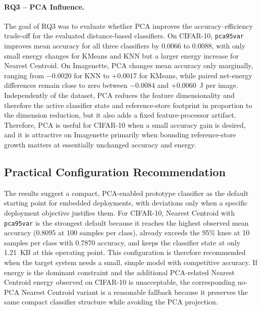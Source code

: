 \documentclass[sigconf,review,nonacm]{acmart}
\begin{document}
\paragraph{RQ3 -- PCA Influence.}
The goal of RQ3 was to evaluate whether PCA improves the accuracy--efficiency trade-off for the evaluated distance-based classifiers.
On CIFAR-10, \texttt{pca95var} improves mean accuracy for all three classifiers by 0.0066 to 0.0088, with only small energy changes for KMeans and KNN but a larger energy increase for Nearest Centroid.
On Imagenette, PCA changes mean accuracy only marginally, ranging from $-$0.0020 for KNN to +0.0017 for KMeans, while paired net-energy differences remain close to zero between $-$0.0084 and +0.0060~J per image.
Independently of the dataset, PCA reduces the feature dimensionality and therefore the active classifier state and reference-store footprint in proportion to the dimension reduction, but it also adds a fixed feature-processor artifact.
Therefore, PCA is useful for CIFAR-10 when a small accuracy gain is desired, and it is attractive on Imagenette primarily when bounding reference-store growth matters at essentially unchanged accuracy and energy.

\subsection{Practical Configuration Recommendation}
The results suggest a compact, PCA-enabled prototype classifier as the default starting point for embedded deployments, with deviations only when a specific deployment objective justifies them.
For CIFAR-10, Nearest Centroid with \texttt{pca95var} is the strongest default because it reaches the highest observed mean accuracy (0.8095 at 100 samples per class), already exceeds the 95\% knee at 10 samples per class with 0.7870 accuracy, and keeps the classifier state at only 1.21~KB at this operating point.
This configuration is therefore recommended when the target system needs a small, simple model with competitive accuracy.
If energy is the dominant constraint and the additional PCA-related Nearest Centroid energy observed on CIFAR-10 is unacceptable, the corresponding no-PCA Nearest Centroid variant is a reasonable fallback because it preserves the same compact classifier structure while avoiding the PCA projection.
\end{document}
